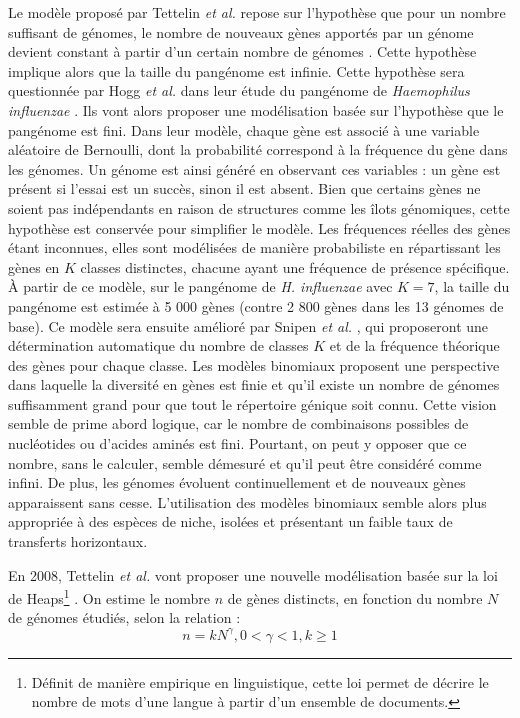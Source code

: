 Le modèle proposé par Tettelin \textit{et al.} repose sur l'hypothèse que pour un nombre suffisant de génomes, le nombre de nouveaux gènes apportés par un génome devient constant à partir d'un certain nombre de génomes \cite{tettelin_genome_2005}. Cette hypothèse implique alors que la taille du pangénome est infinie. Cette hypothèse sera questionnée par Hogg \textit{et al.} dans leur étude du pangénome de \textit{Haemophilus influenzae} \cite{hogg_characterization_2007}. Ils vont alors proposer une modélisation basée sur l'hypothèse que le pangénome est fini. Dans leur modèle, chaque gène est associé à une variable aléatoire de Bernoulli, dont la probabilité correspond à la fréquence du gène dans les génomes. Un génome est ainsi généré en observant ces variables : un gène est présent si l’essai est un succès, sinon il est absent. Bien que certains gènes ne soient pas indépendants en raison de structures comme les îlots génomiques, cette hypothèse est conservée pour simplifier le modèle. Les fréquences réelles des gènes étant inconnues, elles sont modélisées de manière probabiliste en répartissant les gènes en $K$ classes distinctes, chacune ayant une fréquence de présence spécifique. À partir de ce modèle, sur le pangénome de \textit{H. influenzae} avec $K=7$, la taille du pangénome est estimée à 5 000 gènes (contre 2 800 gènes dans les 13 génomes de base). Ce modèle sera ensuite amélioré par Snipen \textit{et al.} \cite{snipen_microbial_2009}, qui proposeront une détermination automatique du nombre de classes $K$ et de la fréquence théorique des gènes pour chaque classe. Les modèles binomiaux proposent une perspective dans laquelle la diversité en gènes est finie et qu'il existe un nombre de génomes suffisamment grand pour que tout le répertoire génique soit connu. Cette vision semble de prime abord logique, car le nombre de combinaisons possibles de nucléotides ou d'acides aminés est fini. Pourtant, on peut y opposer que ce nombre, sans le calculer, semble démesuré et qu'il peut être considéré comme infini. De plus, les génomes évoluent continuellement et de nouveaux gènes apparaissent sans cesse. L'utilisation des modèles binomiaux semble alors plus appropriée à des espèces de niche, isolées et présentant un faible taux de transferts horizontaux.

En 2008, Tettelin \textit{et al.} vont proposer une nouvelle modélisation basée sur la loi de Heaps\footnote{Définit de manière empirique en linguistique, cette loi permet de décrire le nombre de mots d'une langue à partir d'un ensemble de documents.} \cite{tettelin_comparative_2008}. On estime le nombre $n$ de gènes distincts, en fonction du nombre $N$ de génomes étudiés, selon la relation :
\begin{equation}
    n=kN^\gamma, 0<\gamma<1,k\geq1
\end{equation}

